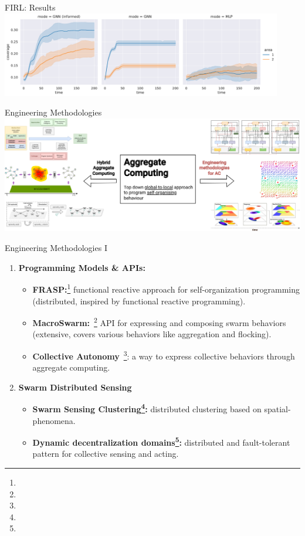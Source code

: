 \documentclass[presentation, 8pt,169]{beamer}\mode<presentation>{\usetheme{AMSBolognaFC}}
\begin{document}
\begin{frame}[allowframebreaks]{FIRL: Results}
\includegraphics[width=0.92\textwidth]{img/coverage-two-test.pdf}

\end{frame}
\begin{frame}{Engineering Methodologies}
  \includegraphics[width=\textwidth]{img/eng-part.drawio.png}
\end{frame}
\begin{frame}[fragile]{Engineering Methodologies I }

  \begin{enumerate}
  \item \textbf{Programming Models \& APIs:}
  
  \begin{itemize}
  \item \textbf{FRASP:}\footnote{} functional reactive approach for self-organization programming (distributed, inspired by functional reactive programming).
  \item \textbf{MacroSwarm:}~\footnote{} API for expressing and composing swarm behaviors (extensive, covers various behaviors like aggregation and flocking).
  \item \textbf{Collective Autonomy}~\footnote{}: a way to express collective behaviors through aggregate computing.
  \end{itemize}
  
  \item \textbf{Swarm Distributed Sensing}
  
  \begin{itemize}
  \item \textbf{Swarm Sensing Clustering\footnote{}:} distributed clustering based on spatial-phenomena.
  \item \textbf{Dynamic decentralization domains\footnote{}:} distributed and fault-tolerant pattern for collective sensing and acting.
  \end{itemize}
\end{enumerate}

\end{frame}
\end{document}
